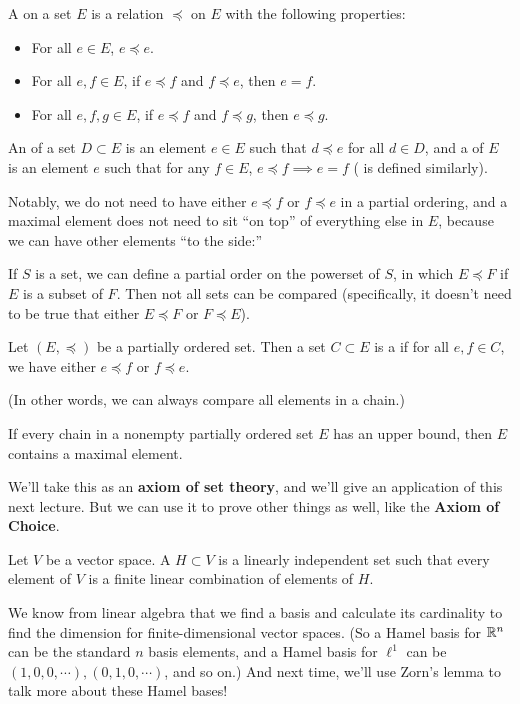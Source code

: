 \begin{definition}
A  on a set $E$ is a relation $\preceq$ on $E$ with the following properties:
\begin{itemize}
\item For all $e \in E$, $e \preceq e$.
\item For all $e, f \in E$, if $e \preceq f$ and $f \preceq e$, then $e = f$.
\item For all $e, f, g \in E$, if $e \preceq f$ and $f \preceq g$, then $e \preceq g$.
\end{itemize}
An  of a set $D \subset E$ is an element $e \in E$ such that $d \preceq e$ for all $d \in D$, and a  of $E$ is an element $e$ such that for any $f \in E$, $e \preceq f \implies e = f$ ( is defined similarly).
\end{definition}

Notably, we do not need to have either $e \preceq f$ or $f \preceq e$ in a partial ordering, and a maximal element does not need to sit ``on top'' of everything else in $E$, because we can have other elements ``to the side:''

\begin{example}
If $S$ is a set, we can define a partial order on the powerset of $S$, in which $E \preceq F$ if $E$ is a subset of $F$. Then not all sets can be compared (specifically, it doesn't need to be true that either $E \preceq F$ or $F \preceq E$).
\end{example}

\begin{definition}
Let $(E, \preceq)$ be a partially ordered set. Then a set $C \subset E$ is a  if for all $e, f \in C$, we have either $e \preceq f$ or $f \preceq e$.
\end{definition}

(In other words, we can always compare all elements in a chain.)

\begin{proposition}
If every chain in a nonempty partially ordered set $E$ has an upper bound, then $E$ contains a maximal element.
\end{proposition}

We'll take this as an \textbf{axiom of set theory}, and we'll give an application of this next lecture. But we can use it to prove other things as well, like the \textbf{Axiom of Choice}.

\begin{definition}
Let $V$ be a vector space. A  $H \subset V$ is a linearly independent set such that every element of $V$ is a finite linear combination of elements of $H$. 
\end{definition}

We know from linear algebra that we find a basis and calculate its cardinality to find the dimension for finite-dimensional vector spaces. (So a Hamel basis for $\mathbb R^n$ can be the standard $n$ basis elements, and a Hamel basis for $\ell^1$ can be $(1, 0, 0, \cdots), (0, 1, 0, \cdots)$, and so on.) And next time, we'll use Zorn's lemma to talk more about these Hamel bases!